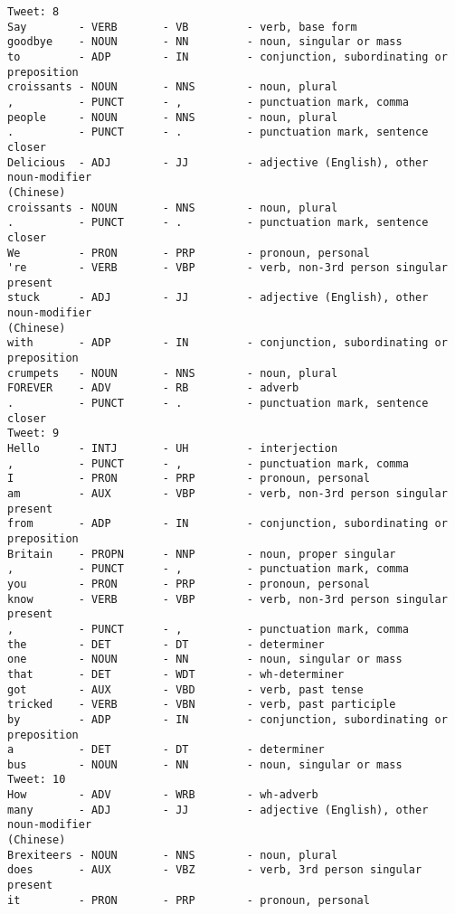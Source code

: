 \documentclass[11pt]{article}
\begin{document}
\begin{Verbatim}[commandchars=\\\{\}]
Tweet: 8
Say        - VERB       - VB         - verb, base form
goodbye    - NOUN       - NN         - noun, singular or mass
to         - ADP        - IN         - conjunction, subordinating or preposition
croissants - NOUN       - NNS        - noun, plural
,          - PUNCT      - ,          - punctuation mark, comma
people     - NOUN       - NNS        - noun, plural
.          - PUNCT      - .          - punctuation mark, sentence closer
Delicious  - ADJ        - JJ         - adjective (English), other noun-modifier
(Chinese)
croissants - NOUN       - NNS        - noun, plural
.          - PUNCT      - .          - punctuation mark, sentence closer
We         - PRON       - PRP        - pronoun, personal
're        - VERB       - VBP        - verb, non-3rd person singular present
stuck      - ADJ        - JJ         - adjective (English), other noun-modifier
(Chinese)
with       - ADP        - IN         - conjunction, subordinating or preposition
crumpets   - NOUN       - NNS        - noun, plural
FOREVER    - ADV        - RB         - adverb
.          - PUNCT      - .          - punctuation mark, sentence closer
Tweet: 9
Hello      - INTJ       - UH         - interjection
,          - PUNCT      - ,          - punctuation mark, comma
I          - PRON       - PRP        - pronoun, personal
am         - AUX        - VBP        - verb, non-3rd person singular present
from       - ADP        - IN         - conjunction, subordinating or preposition
Britain    - PROPN      - NNP        - noun, proper singular
,          - PUNCT      - ,          - punctuation mark, comma
you        - PRON       - PRP        - pronoun, personal
know       - VERB       - VBP        - verb, non-3rd person singular present
,          - PUNCT      - ,          - punctuation mark, comma
the        - DET        - DT         - determiner
one        - NOUN       - NN         - noun, singular or mass
that       - DET        - WDT        - wh-determiner
got        - AUX        - VBD        - verb, past tense
tricked    - VERB       - VBN        - verb, past participle
by         - ADP        - IN         - conjunction, subordinating or preposition
a          - DET        - DT         - determiner
bus        - NOUN       - NN         - noun, singular or mass
Tweet: 10
How        - ADV        - WRB        - wh-adverb
many       - ADJ        - JJ         - adjective (English), other noun-modifier
(Chinese)
Brexiteers - NOUN       - NNS        - noun, plural
does       - AUX        - VBZ        - verb, 3rd person singular present
it         - PRON       - PRP        - pronoun, personal

\end{Verbatim}
\end{document}
